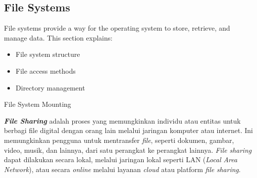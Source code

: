\documentclass[12pt]{article}
\begin{document}
\subsection{File Systems}
File systems provide a way for the operating system to store, retrieve, and manage data. This section explains:
\begin{itemize}
    \item File system structure
    \item File access methods
    \item Directory management
\end{itemize}
\item File System Mounting 
\item \textbf{\textit{File Sharing}} adalah proses yang memungkinkan individu atau entitas untuk berbagi file digital dengan orang lain melalui jaringan komputer atau internet. Ini memungkinkan pengguna untuk mentransfer \textit{file}, seperti dokumen, gambar, video, musik, dan lainnya, dari satu perangkat ke perangkat lainnya. \textit{File sharing} dapat dilakukan secara lokal, melalui jaringan lokal seperti LAN (\textit{Local Area Network}), atau secara \textit{online} melalui layanan\textit{ cloud} atau platform \textit{file sharing}.
\end{document}
